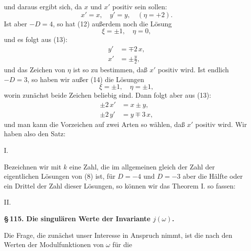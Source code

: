 und daraus ergibt sich, da $x$ und $x'$ positiv sein sollen:
\[
x' = x, \quad y' = y, \quad (\eta = + 2).
\]
Ist aber $-D = 4$, so hat (12) außerdem noch die Lösung
\[
\xi = \pm 1, \quad \eta = 0,
\]
und es folgt aus (13):
\[
\begin{aligned}
y' &= \mp 2\,x, \\
x' &= \pm \frac{y}{2},
\end{aligned}
\]
und das Zeichen von $\eta$ ist so zu bestimmen, daß $x'$ positiv wird. %
Ist endlich $-D = 3$, so haben wir außer (14) die Lösungen
\[
\xi = \pm 1, \quad \eta = \pm 1,
\]
worin zunächst beide Zeichen beliebig sind.
Dann folgt aber aus (13):
\[
\begin{aligned}
\pm 2\,x' &= x \pm y, \\
\pm 2\,y' &= y \mp 3\,x,
\end{aligned}
\]
und man kann die Vorzeichen auf zwei Arten so wählen, daß $x'$ positiv wird. Wir haben also den Satz:

I. 

Bezeichnen wir mit $k$ eine Zahl, die im allgemeinen gleich der Zahl der eigentlichen Lösungen von (8) ist, für $D = -4$ und $D = -3$ aber die Hälfte oder ein Drittel der Zahl dieser Lösungen, so können wir das Theorem I. so fassen:

II. 

\begin{center}
\textbf{\S\,115. Die singulären Werte der Invariante $j(\omega)$.}
\end{center}

Die Frage, die zunächst unser Interesse in Anspruch nimmt, ist die nach den Werten der Modulfunktionen von $\omega$ für die
